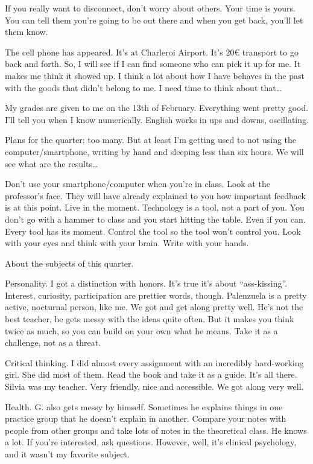 \documentclass[]{book}
\begin{document}
If you really want to disconnect, don't worry about others. Your time is yours. You can tell them you're going to be out there and when you get back, you'll let them know.

The cell phone has appeared. It's at Charleroi Airport. It's 20€ transport to go back and forth. So, I will see if I can find someone who can pick it up for me. It makes me think it showed up. I think a lot about how I have behaves in the past with the goods that didn't belong to me. I need time to think about that\ldots{}

My grades are given to me on the 13th of February. Everything went pretty good. I'll tell you when I know numerically. English works in ups and downs, oscillating.

Plans for the quarter: too many. But at least I'm getting used to not using the computer/smartphone, writing by hand and sleeping less than six hours. We will see what are the results\ldots{}

Don't use your smartphone/computer when you're in class. Look at the professor's face. They will have already explained to you how important feedback is at this point. Live in the moment. Technology is a tool, not a part of you. You don't go with a hammer to class and you start hitting the table. Even if you can. Every tool has its moment. Control the tool so the tool won't control you. Look with your eyes and think with your brain. Write with your hands.

About the subjects of this quarter.

Personality. I got a distinction with honors. It's true it's about ``ass-kissing''. Interest, curiosity, participation are prettier words, though. Palenzuela is a pretty active, nocturnal person, like me. We got and get along pretty well. He's not the best teacher, he gets messy with the ideas quite often. But it makes you think twice as much, so you can build on your own what he means. Take it as a challenge, not as a threat.

Critical thinking. I did almost every assignment with an incredibly hard-working girl. She did most of them. Read the book and take it as a guide. It's all there. Silvia was my teacher. Very friendly, nice and accessible. We got along very well.

Health. G. also gets messy by himself. Sometimes he explains things in one practice group that he doesn't explain in another. Compare your notes with people from other groups and take lots of notes in the theoretical class. He knows a lot. If you're interested, ask questions. However, well, it's clinical psychology, and it wasn't my favorite subject.
\end{document}
